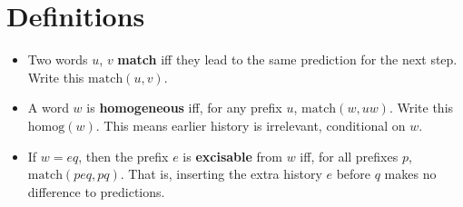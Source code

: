 \documentclass{article}
\newcommand{\match}{\ensuremath{\mathrm{match}}}
\newcommand{\homog}{\ensuremath{\mathrm{homog}}}
\begin{document}
\section{Definitions}

\begin{itemize}
\item Two words $u$, $v$ {\bf match} iff they lead to the same prediction for
  the next step.  Write this $\match(u,v)$.
\item A word $w$ is {\bf homogeneous} iff, for any prefix $u$, $\match(w,uw)$.
  Write this $\homog(w)$.  This means earlier history is irrelevant,
  conditional on $w$.
\item If $w=eq$, then the prefix $e$ is {\bf excisable} from $w$ iff, for all
  prefixes $p$, $\match(peq, pq)$.  That is, inserting the extra history $e$
  before $q$ makes no difference to predictions.
\end{itemize}
\end{document}
